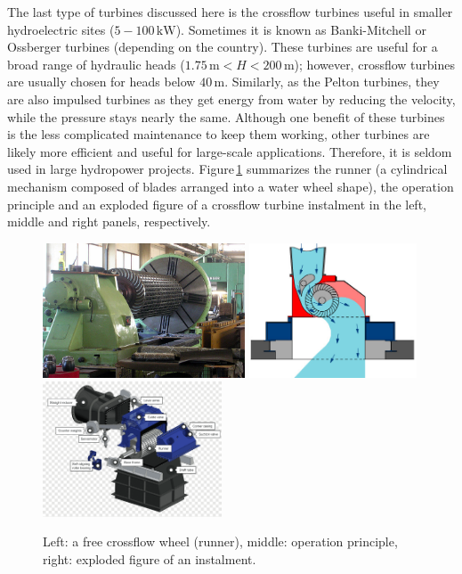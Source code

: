 The last type of turbines discussed here is the crossflow turbines useful in smaller hydroelectric sites ($5-100\,\mathrm{kW}$). Sometimes it is known as Banki-Mitchell or Ossberger turbines (depending on the country). These turbines are useful for a broad range of hydraulic heads ($1.75\,\mathrm{m}<H<200\,\mathrm{m}$); however, crossflow turbines are usually chosen for heads below $40\,\mathrm{m}$. Similarly, as the Pelton turbines, they are also impulsed turbines as they get energy from water by reducing the velocity, while the pressure stays nearly the same. Although one benefit of these turbines is the less complicated maintenance to keep them working, other turbines are likely more efficient and useful for large-scale applications. Therefore, it is seldom used in large hydropower projects. Figure\,\ref{Fig:crossflow_turbine} summarizes the runner (a cylindrical mechanism composed of blades arranged into a water wheel shape), the operation principle and an exploded figure of a crossflow turbine instalment in the left, middle and right panels, respectively.

\begin{figure}[ht!]
	\centering
		\includegraphics[height=4cm]{HydroAndWindPower/Figures/CrossFlow_Turbine_1.jpg}
		\includegraphics[height=4cm]{HydroAndWindPower/Figures/CrossFlow_Turbine_2.jpg}
		\includegraphics[height=4cm]{HydroAndWindPower/Figures/CrossFlow_Turbine_3.png}
	\caption{Left: a free crossflow wheel (runner), middle: operation principle, right: exploded figure of an instalment.}
	\label{Fig:crossflow_turbine}
\end{figure}

